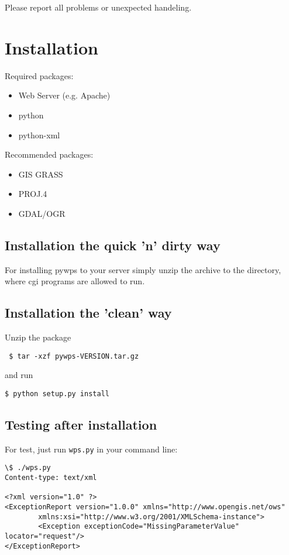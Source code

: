 \documentclass[a4paper,11pt]{article}
\begin{document}
    Please report all problems or unexpected handeling.

    \section{Installation}
     
    Required packages:
     
    \begin{itemize}
        \item Web Server (e.g. Apache) 
        \item python 
        \item python-xml 
    \end{itemize}
     
    Recommended packages:
     
    \begin{itemize}
        \item GIS GRASS 
        \item PROJ.4 
        \item GDAL/OGR 
    \end{itemize}
     
    \subsection{Installation the quick 'n' dirty way}
    For installing pywps to your server simply unzip the archive to the
    directory, where cgi programs are allowed to run. 

    \subsection{Installation the 'clean' way}
    Unzip the package 
    \begin{verbatim}
 $ tar -xzf pywps-VERSION.tar.gz
    \end{verbatim}
    and run 
    \begin{verbatim}
$ python setup.py install
    \end{verbatim}
    
    \subsection{Testing after installation}
    For test, just run
    \texttt{wps.py} in your command line:
     
    \begin{verbatim}
\$ ./wps.py
Content-type: text/xml

<?xml version="1.0" ?>
<ExceptionReport version="1.0.0" xmlns="http://www.opengis.net/ows" 
        xmlns:xsi="http://www.w3.org/2001/XMLSchema-instance">
        <Exception exceptionCode="MissingParameterValue" locator="request"/>
</ExceptionReport>
    \end{verbatim}
\end{document}
